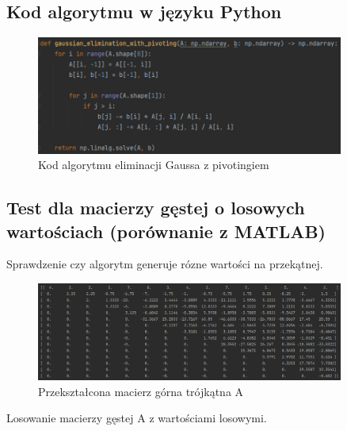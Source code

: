 \documentclass[9pt]{article}
\begin{document}
\subsection{Kod algorytmu w języku Python}

\begin{figure}[h]
  \centering
  \includegraphics[width=0.9\textwidth]{gaussian_elimination_with_pivoting.jpg}
  \caption{Kod algorytmu eliminacji Gaussa z pivotingiem}
\end{figure}
\newpage

\subsection{Test dla macierzy gęstej o losowych wartościach (porównanie z MATLAB)}

Sprawdzenie czy algorytm generuje rózne wartości na przekątnej.

\begin{figure}[h]
  \centering
  \includegraphics[width=0.9\textwidth]{values_on_diagonal.jpg}
  \caption{Przekształcona macierz górna trójkątna A}
\end{figure}

Losowanie macierzy gęstej A z wartościami losowymi.
\end{document}
